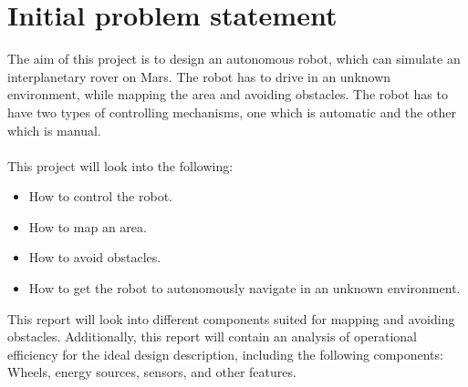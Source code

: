 \chapter{Initial problem statement}

The aim of this project is to design an autonomous robot, which can simulate an interplanetary rover on Mars. The robot has to drive in an unknown environment, while mapping the area and avoiding obstacles. The robot has to have two types of controlling mechanisms, one which is automatic and the other which is manual.\\
\\
This project will look into the following:

\begin{itemize}
\item How to control the robot.
\item How to map an area.
\item How to avoid obstacles.
\item How to get the robot to autonomously navigate in an unknown environment.
\end{itemize}

This report will look into different components suited for mapping and avoiding obstacles.
Additionally, this report will contain an analysis of operational efficiency for the ideal design description, including the following components: Wheels, energy sources, sensors, and other features. 









